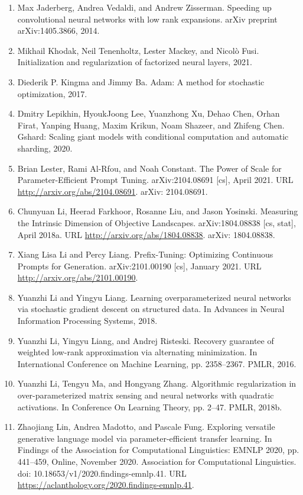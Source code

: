 \documentclass[11pt,UTF8,fontset=fandol]{ctexart}
\begin{document}
\begin{enumerate}[leftmargin=2em,itemsep=2pt]
\item Max Jaderberg, Andrea Vedaldi, and Andrew Zisserman. Speeding up convolutional neural networks with low rank expansions. arXiv preprint arXiv:1405.3866, 2014.
\item Mikhail Khodak, Neil Tenenholtz, Lester Mackey, and Nicol\`o Fusi. Initialization and regularization of factorized neural layers, 2021.
\item Diederik P. Kingma and Jimmy Ba. Adam: A method for stochastic optimization, 2017.
\item Dmitry Lepikhin, HyoukJoong Lee, Yuanzhong Xu, Dehao Chen, Orhan Firat, Yanping Huang, Maxim Krikun, Noam Shazeer, and Zhifeng Chen. Gshard: Scaling giant models with conditional computation and automatic sharding, 2020.
\item Brian Lester, Rami Al-Rfou, and Noah Constant. The Power of Scale for Parameter-Efficient Prompt Tuning. arXiv:2104.08691 [cs], April 2021. URL \url{http://arxiv.org/abs/2104.08691}. arXiv: 2104.08691.
\item Chunyuan Li, Heerad Farkhoor, Rosanne Liu, and Jason Yosinski. Measuring the Intrinsic Dimension of Objective Landscapes. arXiv:1804.08838 [cs, stat], April 2018a. URL \url{http://arxiv.org/abs/1804.08838}. arXiv: 1804.08838.
\item Xiang Lisa Li and Percy Liang. Prefix-Tuning: Optimizing Continuous Prompts for Generation. arXiv:2101.00190 [cs], January 2021. URL \url{http://arxiv.org/abs/2101.00190}.
\item Yuanzhi Li and Yingyu Liang. Learning overparameterized neural networks via stochastic gradient descent on structured data. In Advances in Neural Information Processing Systems, 2018.
\item Yuanzhi Li, Yingyu Liang, and Andrej Risteski. Recovery guarantee of weighted low-rank approximation via alternating minimization. In International Conference on Machine Learning, pp. 2358--2367. PMLR, 2016.
\item Yuanzhi Li, Tengyu Ma, and Hongyang Zhang. Algorithmic regularization in over-parameterized matrix sensing and neural networks with quadratic activations. In Conference On Learning Theory, pp. 2--47. PMLR, 2018b.
\item Zhaojiang Lin, Andrea Madotto, and Pascale Fung. Exploring versatile generative language model via parameter-efficient transfer learning. In Findings of the Association for Computational Linguistics: EMNLP 2020, pp. 441--459, Online, November 2020. Association for Computational Linguistics. doi: 10.18653/v1/2020.findings-emnlp.41. URL \url{https://aclanthology.org/2020.findings-emnlp.41}.

\end{enumerate}
\end{document}
